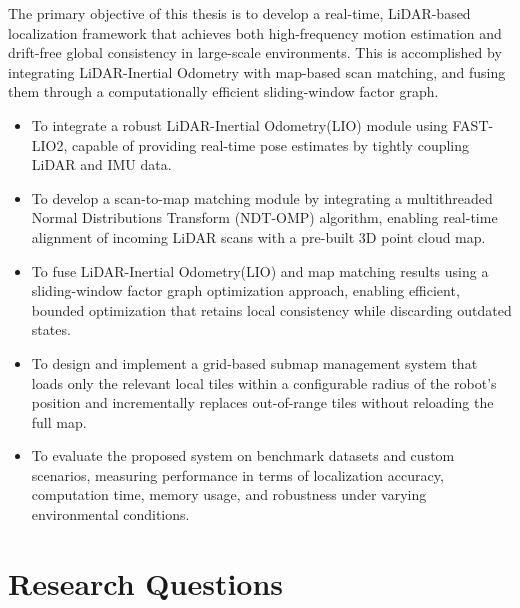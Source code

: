 The primary objective of this thesis is to develop a real-time, LiDAR-based localization framework that achieves both high-frequency motion estimation and drift-free global consistency in large-scale environments. This is accomplished by integrating LiDAR-Inertial Odometry with map-based scan matching, and fusing them through a computationally efficient sliding-window factor graph.
\begin{itemize}
    \item To integrate a robust LiDAR-Inertial Odometry(LIO) module using FAST-LIO2, capable of providing real-time pose estimates by tightly coupling LiDAR and IMU data.
    \item To develop a scan-to-map matching module by integrating a multithreaded Normal Distributions Transform (NDT-OMP) algorithm, enabling real-time alignment of incoming LiDAR scans with a pre-built 3D point cloud map. 

   
    \item To fuse LiDAR-Inertial Odometry(LIO) and map matching results using a sliding-window factor graph optimization approach, enabling efficient, bounded optimization that retains local consistency while discarding outdated states.
     \item To design and implement a grid-based submap management system that loads only the relevant local tiles within a configurable radius of the robot’s position and incrementally replaces out-of-range tiles without reloading the full map.
    \item To evaluate the proposed system on benchmark datasets and custom scenarios, measuring performance in terms of localization accuracy, computation time, memory usage, and robustness under varying environmental conditions.
\end{itemize}
\section{Research Questions}

